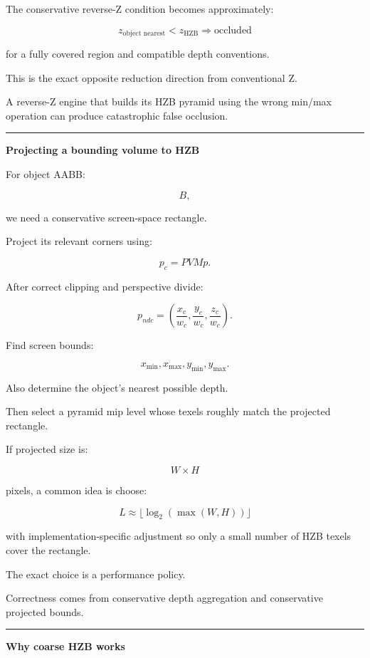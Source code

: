 The conservative reverse-Z condition becomes approximately:

\[
\boxed{
z_{\text{object nearest}}
<
z_{\text{HZB}}
\Rightarrow
\text{occluded}
}
\]

for a fully covered region and compatible depth conventions.

This is the exact opposite reduction direction from conventional Z.

A reverse-Z engine that builds its HZB pyramid using the wrong min/max operation can produce catastrophic false occlusion.

\begin{center}\rule{0.5\linewidth}{0.5pt}\end{center}

\textbf{Projecting a bounding volume to HZB}

For object AABB:

\[
B,
\]

we need a conservative screen-space rectangle.

Project its relevant corners using:

\[
p_c=PVMp.
\]

After correct clipping and perspective divide:

\[
p_{ndc}=
\left(
\frac{x_c}{w_c},
\frac{y_c}{w_c},
\frac{z_c}{w_c}
\right).
\]

Find screen bounds:

\[
x_{\min},x_{\max},
y_{\min},y_{\max}.
\]

Also determine the object's nearest possible depth.

Then select a pyramid mip level whose texels roughly match the projected rectangle.

If projected size is:

\[
W\times H
\]

pixels, a common idea is choose:

\[
L\approx
\lfloor
\log_2(\max(W,H))
\rfloor
\]

with implementation-specific adjustment so only a small number of HZB texels cover the rectangle.

The exact choice is a performance policy.

Correctness comes from conservative depth aggregation and conservative projected bounds.

\begin{center}\rule{0.5\linewidth}{0.5pt}\end{center}

\textbf{Why coarse HZB works}

